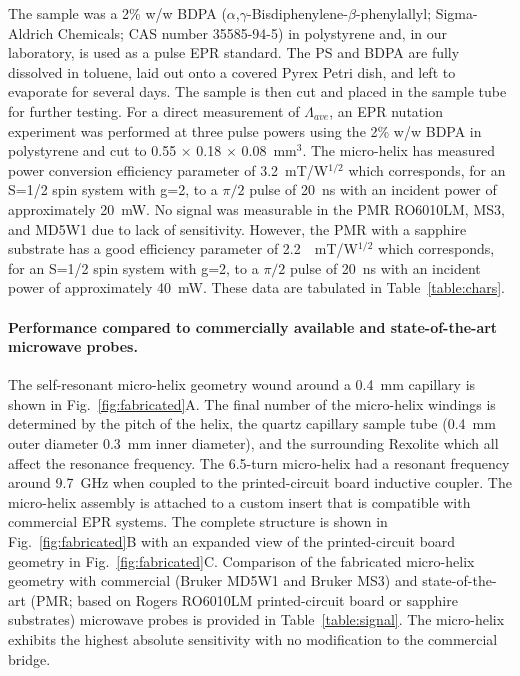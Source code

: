 The sample was a 2\% w/w BDPA ($\alpha$,$\gamma$-Bisdiphenylene-$\beta$-phenylallyl; Sigma-Aldrich Chemicals; CAS number 35585-94-5) in polystyrene and, in our laboratory, is used as a pulse EPR standard. The PS and BDPA are fully dissolved in toluene, laid out onto a covered Pyrex Petri dish, and left to evaporate for several days. The sample is then cut and placed in the sample tube for further testing. For a direct measurement of $\Lambda_{ave}$, an EPR nutation experiment was performed at three pulse powers using the 2\% w/w BDPA in polystyrene and cut to 0.55 $\times$ 0.18 $\times$ 0.08~mm$^3$. The micro-helix has measured power conversion efficiency parameter of 3.2~mT/W$^{1/2}$ which corresponds, for an S=1/2 spin system with g=2, to a $\pi/2$ pulse of 20~ns with an incident power of approximately 20~mW. No signal was measurable in the PMR RO6010LM, MS3, and MD5W1 due to lack of sensitivity. However, the PMR with a sapphire substrate has a good efficiency parameter of 2.2~~mT/W$^{1/2}$ which corresponds, for an S=1/2 spin system with g=2, to a $\pi/2$ pulse of 20~ns with an incident power of approximately 40~mW. These data are tabulated in Table~\ref{table:chars}.

\paragraph{Performance compared to commercially available and state-of-the-art microwave probes.}
The self-resonant micro-helix geometry wound around a 0.4~mm capillary is shown in Fig.~\ref{fig:fabricated}A. The final number of the micro-helix windings is determined by the pitch of the helix, the quartz capillary sample tube (0.4~mm outer diameter 0.3~mm inner diameter), and the surrounding Rexolite which all affect the resonance frequency. The 6.5-turn micro-helix had a resonant frequency around 9.7~GHz when coupled to the printed-circuit board inductive coupler. The micro-helix assembly is attached to a custom insert that is compatible with commercial EPR systems. The complete structure is shown in Fig.~\ref{fig:fabricated}B with an expanded view of the printed-circuit board geometry in Fig.~\ref{fig:fabricated}C. Comparison of the fabricated micro-helix geometry with commercial (Bruker MD5W1 and Bruker MS3) and state-of-the-art (PMR; based on Rogers RO6010LM printed-circuit board or sapphire substrates) microwave probes is provided in Table~\ref{table:signal}. The micro-helix exhibits the highest absolute sensitivity with no modification to the commercial bridge. 

